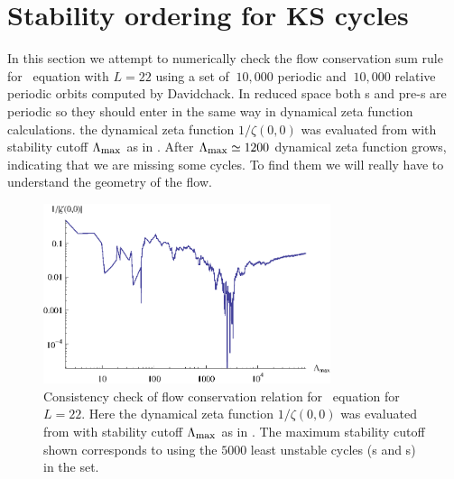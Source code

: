 \section{Stability ordering for KS cycles}
\label{s-StOrdKS}

In this section we attempt to numerically check the
flow conservation sum rule  for \KS\ equation with $L=22$
using a set of $~10,000$ periodic and $~10,000$ relative
periodic orbits  computed by Davidchack.
In reduced space both \rpo s and pre-\po s are periodic so they should
enter in the same way in dynamical zeta function calculations. the dynamical zeta function $1/\zeta(0,0)$ was evaluated
from  with stability cutoff $\stabCutoff$ as
in . After $\stabCutoff\simeq1200$
dynamical zeta function grows, indicating that we are missing some cycles.
To find them we will really have to understand the geometry of the flow.

\begin{figure}
    \vspace*{-5pt}
\begin{center}
	\includegraphics[width=0.75\textwidth]{../figs/ksStabOrder5000}
\end{center}
\caption[Flow conservation for \KS, $L=22$]
    {
Consistency check of flow conservation relation 
for \KS\ equation  for $L=22$.
Here the dynamical zeta function $1/\zeta(0,0)$ was evaluated
from  with stability cutoff $\stabCutoff$ as
in . The maximum stability cutoff shown corresponds
to using the $5000$ least unstable cycles (\po s and \rpo s) in the set.
	}
\label{fig:zetaStabOrderKS22}
    \vspace*{-5pt}
\end{figure}
